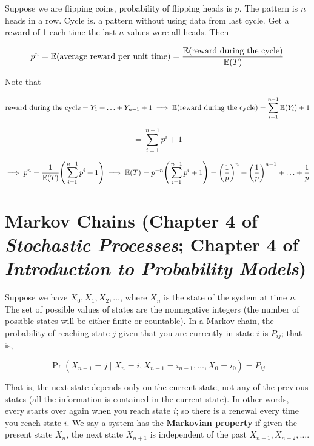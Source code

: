 \begin{example}Suppose we are flipping coins, probability of flipping heads is \(p\). The pattern is \(n\) heads in a row. Cycle is. a pattern without using data from last cycle. Get a reward of 1 each time the last \(n\) values were all heads. Then

\[
p^n = \mathbb{E}( \text{average reward per unit time})  =  \frac{ \mathbb{E}( \text{reward during the cycle}) }{\mathbb{E}(T)}
\]

Note that

\[
\text{reward during the cycle} = Y_1 + \ldots + Y_{n-1} + 1 \implies \mathbb{E}(\text{reward during the cycle} ) = \sum_{i=1}^{n-1} \mathbb{E}(Y_i) + 1  
\]

\[
 = \sum_{i=1}^{n-1} p^i + 1  
\]

\[
\implies p^n = \frac{ 1}{\mathbb{E}(T)} \Bigg( \sum_{i=1}^{n-1} p^i + 1  \Bigg) \implies \mathbb{E}(T) = p^{-n} \Bigg(  \sum_{i=1}^{n-1} p^i + 1 \Bigg) = \bigg( \frac{1}{p} \bigg)^n + \bigg( \frac{1}{p} \bigg)^{n-1} + \ldots + \frac{1}{p}
\]

\end{example}

\section{Markov Chains (Chapter 4 of \textit{Stochastic Processes}; Chapter 4 of \textit{Introduction to Probability Models})}

Suppose we have \(X_0, X_1, X_2, \ldots\), where \(X_n\) is the state of the system at time \(n\). The set of possible values of states are the nonnegative integers (the number of possible states will be either finite or countable). In a Markov chain, the probability of reaching state \(j\) given that you are currently in state \(i\) is \(P_{ij}\); that is,

\[
\Pr(X_{n+1} = j \mid X_n =i, X_{n-1} = i_{n-1}, \ldots, X_0 = i_0) = P_{ij}
\]

That is, the next state depends only on the current state, not any of the previous states (all the information is contained in the current state). In other words, every starts over again when you reach state \(i\); so there is a renewal every time you reach state \(i\). We say a system has the \textbf{Markovian property} if given the present state \(X_n\), the next state \(X_{n+1}\) is independent of the past \(X_{n-1}, X_{n-2}, \ldots\).

